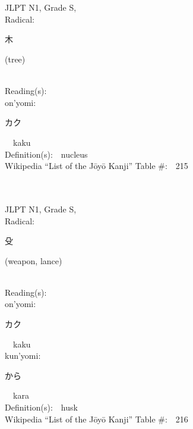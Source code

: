 \begin{multicols}{2}
\ \ \\
{\fontsize{34pt}{40pt}  }\ \ \\
{JLPT N1, Grade S, \\Radical:\ \ {\begin{CJK}{UTF8}{min} 木 \end{CJK}} (tree) } \\
Reading(s):\ \ \\
{\hspace*{1em}}on'yomi:\ \ \\
{\hspace*{2em}}{\begin{CJK}{UTF8}{min} カク \end{CJK}}\ \ kaku\ \ \\
Definition(s):\ \ nucleus \\
Wikipedia ``List of the J\=oy\=o Kanji'' Table \#:\ \ 215 \\
\ \ \\
{\fontsize{34pt}{40pt}  }\ \ \\
{JLPT N1, Grade S, \\Radical:\ \ {\begin{CJK}{UTF8}{min} 殳 \end{CJK}} (weapon, lance) } \\
Reading(s):\ \ \\
{\hspace*{1em}}on'yomi:\ \ \\
{\hspace*{2em}}{\begin{CJK}{UTF8}{min} カク \end{CJK}}\ \ kaku\ \ \\
{\hspace*{1em}}kun'yomi:\ \ \\
{\hspace*{2em}}{\begin{CJK}{UTF8}{min} から \end{CJK}}\ \ kara\ \ \\
Definition(s):\ \ husk \\
Wikipedia ``List of the J\=oy\=o Kanji'' Table \#:\ \ 216 \\
\ \ \\
{\fontsize{34pt}{40pt}  }\ \ \\

\end{multicols}
